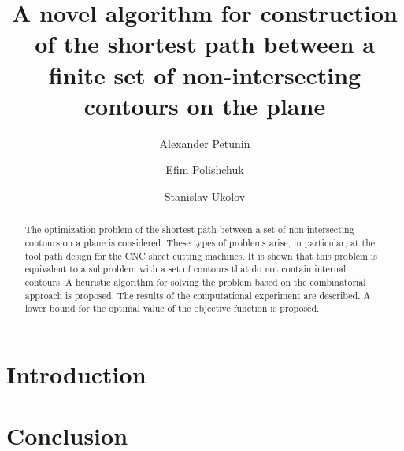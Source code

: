 \documentclass[runningheads]{llncs}
\begin{document}
\title{A novel algorithm for construction of the shortest path between a finite set of non-intersecting contours on the plane}

\author{
  Alexander	Petunin  
  \and
  Efim Polishchuk 
  \and
  Stanislav	Ukolov  
}

\maketitle              %

\begin{abstract}
The optimization problem of the shortest path
between a set of non-intersecting contours on a plane is considered.
These types of problems arise, in particular,
at the tool path design for the CNC sheet cutting machines.
It is shown that this problem is equivalent to a subproblem
with a set of contours that do not contain internal contours.
A heuristic algorithm for solving the problem based on the combinatorial approach is proposed.
The results of the computational experiment are described.
A lower bound for the optimal value of the objective function is proposed.

\end{abstract}

\section{Introduction}

\section{Conclusion}



\nocite{*}
\end{document}
